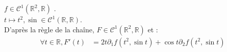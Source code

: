 \documentclass[../main.tex]{subfiles}
\begin{document}
\noindent $f\in \mathcal{C}^1(\mathbb{R}^2, \mathbb{R})$ .\\
$t\mapsto t^2, \sin \in \mathcal{C}^1(\mathbb{R}, \mathbb{R})$. \\
D'après la règle de la chaîne, $F\in \mathcal{C}^1(\mathbb{R}^2, \mathbb{R})$ et : 
\begin{align*}
    \forall t\in \mathbb{R}, F'(t) &= 2t \partial_1 f(t^2, \sin t) + \cos t \partial_2 f(t^2, \sin t)
\end{align*}
\end{document}
